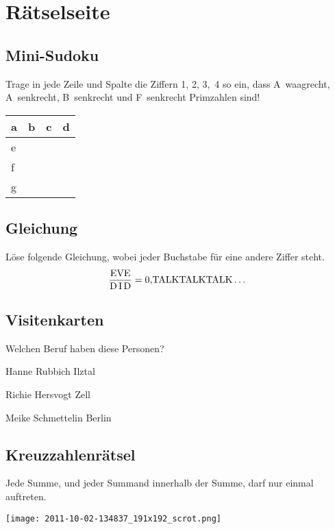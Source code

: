 ﻿\chapter{Rätselseite}

\raggedcolumns
\begin{multicols}{2}
	\section*{Mini-Sudoku}
	Trage in jede Zeile und Spalte die Ziffern 1, 2, 3,~4 so ein, dass A~waagrecht, A~senkrecht, B~senkrecht und F~senkrecht Primzahlen sind!

	\begin{center}
		\begin{tabular}{ |p{0.8cm}|p{0.8cm}|p{0.8cm}|p{0.8cm}| }
		\hline
		  a & b & c & d \\[0.8cm]
		\hline
		  e &   &   &   \\[0.8cm]
		\hline
		  f &   &   &   \\[0.8cm]
		\hline
		  g &   &   &   \\[0.8cm]
		\hline
		\end{tabular}
	\end{center}

	\section*{Gleichung}
	Löse folgende Gleichung, wobei jeder Buchstabe für eine andere Ziffer steht.
	\[\frac{\textrm{EVE}}{\textrm{D\,I\,D}} = \textrm{0,TALKTALKTALK}\dots\]

	\columnbreak
	\section*{Visitenkarten}
	Welchen Beruf haben diese Personen?

	\centerline{Hanne Rubbich \textendash{} Ilztal\\[0.2cm]}
	\centerline{Richie Hersvogt \textendash{} Zell\\[0.2cm]}
	\centerline{Meike Schmettelin \textendash{} Berlin\\[0.2cm]}

	\section*{Kreuzzahlenrätsel}
	Jede Summe, und jeder Summand innerhalb der Summe, darf nur einmal auftreten.

	\texttt{[image: 2011-10-02-134837\_191x192\_scrot.png]}

	\end{multicols}
